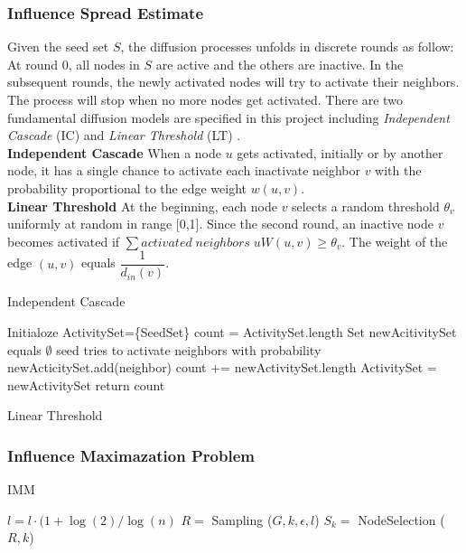 \documentclass[conference,compsoc]{IEEEtran}
\begin{document}
\subsubsection{Influence Spread Estimate}
 Given the seed set $S$, the diffusion processes unfolds in discrete rounds as follow: At round 0, all nodes in $S$ are active and the others are inactive. In the subsequent rounds, the newly activated nodes will try to activate their neighbors. The process will stop when no more nodes get activated. 
 There are two fundamental diffusion models are specified in this project including \textit{Independent Cascade} (IC) and \textit{Linear Threshold} (LT) .\\
\noindent \textbf{Independent Cascade} When a node $u$ gets activated, initially or by another node, it has a single chance to activate each inactivate neighbor $v$ with the probability proportional to the edge weight $w(u, v)$.\\
\noindent \textbf{Linear Threshold} At the beginning, each node $v$ selects a random threshold $\theta_v$ uniformly at random in range [0,1]. Since the second round, an inactive node $v$ becomes activated if $\sum{activated\; neighbors\;u} W(u,v) \geq \theta_v$. The weight of the edge $(u,v)$ equals $\dfrac{1}{d_{in}(v)}$.


\begin{algorithm}[H]
	\caption{Independent Cascade}
	\begin{algorithmic}[1]
		\State Initialoze ActivitySet=\{SeedSet\}
		\State count = ActivitySet.length
		\State Set newAcitivitySet equals $\emptyset$ 
		\State seed tries to activate neighbors with probability
		\State newActicitySet.add(neighbor)
		\EndIf
		\EndFor
		\EndFor
		\State count += newActivitySet.length
		\State ActivitySet = newActivitySet
		\EndWhile
		\EndFunction
		\State return count
	\end{algorithmic}
\end{algorithm}
\begin{algorithm}[H]
	\caption{Linear Threshold}
\end{algorithm}


\subsubsection{Influence Maximazation Problem}
\begin{algorithm}[H]
	\caption{IMM}
	\begin{algorithmic}[1]
			\State $l = l \cdot (1 + \log(2)/\log(n)$
			\State $R = $ Sampling ($G,k,\epsilon,l$)
			\State $S_k = $ NodeSelection ($R,k$)
		\EndFunction	
	\end{algorithmic}
\end{algorithm}
\end{document}
